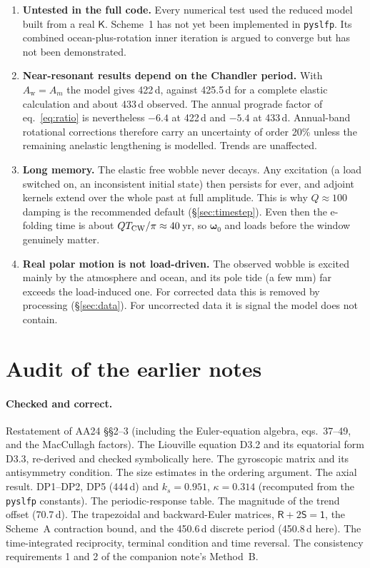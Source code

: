 \documentclass[11pt,a4paper]{article}
\newcommand{\bw}{\bm{\omega}}
\newcommand{\Id}{\mathsf{1}}
\newcommand{\R}{\mathsf{R}}
\newcommand{\Sm}{\mathsf{S}}
\newcommand{\K}{\mathsf{K}}
\newcommand{\Aw}{A_{\mathrm w}}
\begin{document}
\begin{enumerate}
  \item \textbf{Untested in the full code.} Every numerical test used the reduced model built from a
  real $\K$. Scheme~1 has not yet been implemented in \texttt{pyslfp}. Its combined ocean-plus-rotation
  inner iteration is argued to converge but has not been demonstrated.
  \item \textbf{Near-resonant results depend on the Chandler period.} With $\Aw=A_m$ the model gives
  422\,d, against 425.5\,d for a complete elastic calculation and about 433\,d observed. The annual
  prograde factor of eq.~\eqref{eq:ratio} is nevertheless $-6.4$ at 422\,d and $-5.4$ at 433\,d.
  Annual-band rotational corrections therefore carry an uncertainty of order 20\% unless the
  remaining anelastic lengthening is modelled. Trends are unaffected.
  \item \textbf{Long memory.} The elastic free wobble never decays. Any excitation (a load switched
  on, an inconsistent initial state) then persists for ever, and adjoint kernels extend over the whole
  past at full amplitude. This is why $Q\approx100$ damping is the recommended default
  (\S\ref{sec:timestep}). Even then the e-folding time is about $QT_{\rm CW}/\pi\approx40$\,yr, so
  $\bw_0$ and loads before the window genuinely matter.
  \item \textbf{Real polar motion is not load-driven.} The observed wobble is excited mainly by the
  atmosphere and ocean, and its pole tide (a few mm) far exceeds the load-induced one. For corrected
  data this is removed by processing (\S\ref{sec:data}). For uncorrected data it is signal the model
  does not contain.
\end{enumerate}

\appendix
\section{Audit of the earlier notes}
\label{app:audit}

\paragraph{Checked and correct.} Restatement of AA24 \S\S2--3 (including the Euler-equation
algebra, eqs.~37--49, and the MacCullagh factors). The Liouville equation D3.2 and its equatorial
form D3.3, re-derived and checked symbolically here. The gyroscopic matrix and its antisymmetry
condition. The size estimates in the ordering argument. The axial result. DP1--DP2, DP5 (444\,d) and
$k_s=0.951$, $\kappa=0.314$ (recomputed from the \texttt{pyslfp} constants). The periodic-response
table. The magnitude of the trend offset (70.7\,d). The trapezoidal and backward-Euler matrices, $\R+2\Sm=\Id$,
the Scheme~A contraction bound, and the 450.6\,d discrete period (450.8\,d here). The time-integrated
reciprocity, terminal condition and time reversal. The consistency requirements 1 and 2 of the
companion note's Method~B.
\end{document}
